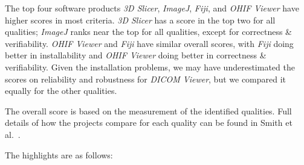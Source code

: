 \documentclass[draft, 12pt, 3p, times]{elsarticle} %
\begin{document}
The top four software products \textit{3D Slicer}, \textit{ImageJ},
\textit{Fiji}, and \textit{OHIF Viewer} have higher scores in most criteria.
\textit{3D Slicer} has a score in the top two for all qualities; \textit{ImageJ}
ranks near the top for all qualities, except for correctness \& verifiability.
\textit{OHIF Viewer} and \textit{Fiji} have similar overall scores, with
\textit{Fiji} doing better in installability and \textit{OHIF Viewer} doing
better in correctness \& verifiability.  Given the installation problems, we may
have underestimated the scores on reliability and robustness for \textit{DICOM
Viewer}, but we compared it equally for the other qualities.

The overall score is based on the measurement of the identified qualities. Full
details of how the projects compare for each quality can be found in Smith et
al.~\cite{SmithEtAl2024_MI_SOP}. 

The highlights are as follows:
\end{document}
